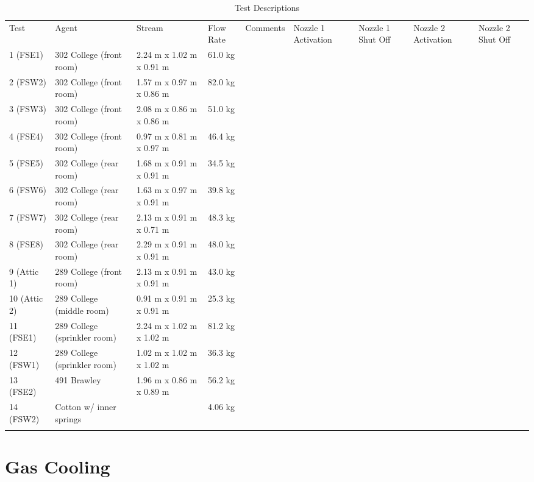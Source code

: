 \documentclass[12pt,oneside]{book}
\begin{document}
\begin{table}
	\centering
	\caption{Test Descriptions}
	\begin{tabular}{lllllllll}
		\hline\noalign{\smallskip}
		Test		& Agent		& Stream		& Flow Rate		& Comments		& Nozzle 1 Activation		& Nozzle 1 Shut Off		& Nozzle 2 Activation		& Nozzle 2 Shut Off \\
		\noalign{\smallskip}\hline\noalign{\smallskip}
		1 (FSE1)    &  302 College (front room)         &  2.24 m x 1.02 m x 0.91 m  &  61.0 kg    \\
		2 (FSW2)   	& 302 College (front room)         &  1.57 m x 0.97 m x 0.86 m  &  82.0 kg    \\
		3 (FSW3) 	&  302 College (front room)         &  2.08 m x 0.86 m x 0.86 m  &  51.0 kg    \\
		4 (FSE4)    &  302 College (front room)         &  0.97 m x 0.81 m x 0.97 m  &  46.4 kg    \\
		5 (FSE5)    &  302 College (rear room)          &  1.68 m x 0.91 m x 0.91 m  &  34.5 kg    \\
		6 (FSW6)    &  302 College (rear room)          &  1.63 m x 0.97 m x 0.91 m  &  39.8 kg    \\
		7 (FSW7)    &  302 College (rear room)          &  2.13 m x 0.91 m x 0.71 m  &  48.3 kg    \\
		8 (FSE8)    &  302 College (rear room)          &  2.29 m x 0.91 m x 0.91 m  &  48.0 kg    \\
		9 (Attic 1) &  289 College (front room)         &  2.13 m x 0.91 m x 0.91 m  &  43.0 kg    \\
		10 (Attic 2)&  289 College (middle room)        &  0.91 m x 0.91 m x 0.91 m  &  25.3 kg    \\
		11 (FSE1)   &  289 College (sprinkler room)     &  2.24 m x 1.02 m x 1.02 m  &  81.2 kg    \\
		12 (FSW1)   &  289 College (sprinkler room)     &  1.02 m x 1.02 m x 1.02 m  &  36.3 kg    \\
		13 (FSE2)   &  491 Brawley                      &  1.96 m x 0.86 m x 0.89 m  &  56.2 kg    \\
		14 (FSW2)   &  Cotton w/ inner springs          &                            &  4.06 kg    \\
		\noalign{\smallskip}\hline
	\end{tabular}
	\label{tab:Fuel_Masses}
\end{table}

\section{Gas Cooling}
\label{sec:Gas_Cooling}
\end{document}
